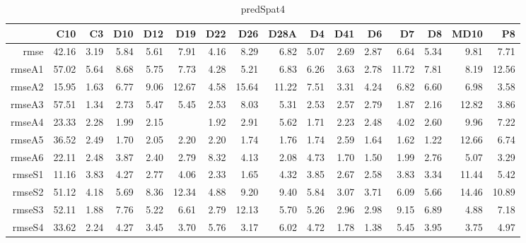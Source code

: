 \begin{table}[H]
\centering
\begin{tabular}{rrrrrrrrrrrrrrrr}
  \hline
 & C10 & C3 & D10 & D12 & D19 & D22 & D26 & D28A & D4 & D41 & D6 & D7 & D8 & MD10 & P8 \\ 
  \hline
rmse & 42.16 & 3.19 & 5.84 & 5.61 & 7.91 & 4.16 & 8.29 & 6.82 & 5.07 & 2.69 & 2.87 & 6.64 & 5.34 & 9.81 & 7.71 \\ 
  rmseA1 & 57.02 & 5.64 & 8.68 & 5.75 & 7.73 & 4.28 & 5.21 & 6.83 & 6.26 & 3.63 & 2.78 & 11.72 & 7.81 & 8.19 & 12.56 \\ 
  rmseA2 & 15.95 & 1.63 & 6.77 & 9.06 & 12.67 & 4.58 & 15.64 & 11.22 & 7.51 & 3.31 & 4.24 & 6.82 & 6.60 & 6.98 & 3.58 \\ 
  rmseA3 & 57.51 & 1.34 & 2.73 & 5.47 & 5.45 & 2.53 & 8.03 & 5.31 & 2.53 & 2.57 & 2.79 & 1.87 & 2.16 & 12.82 & 3.86 \\ 
  rmseA4 & 23.33 & 2.28 & 1.99 & 2.15 &  & 1.92 & 2.91 & 5.62 & 1.71 & 2.23 & 2.48 & 4.02 & 2.60 & 9.96 & 7.22 \\ 
  rmseA5 & 36.52 & 2.49 & 1.70 & 2.05 & 2.20 & 2.20 & 1.74 & 1.76 & 1.74 & 2.59 & 1.64 & 1.62 & 1.22 & 12.66 & 6.74 \\ 
  rmseA6 & 22.11 & 2.48 & 3.87 & 2.40 & 2.79 & 8.32 & 4.13 & 2.08 & 4.73 & 1.70 & 1.50 & 1.99 & 2.76 & 5.07 & 3.29 \\ 
  rmseS1 & 11.16 & 3.83 & 4.27 & 2.77 & 4.06 & 2.33 & 1.65 & 4.32 & 3.85 & 2.67 & 2.58 & 3.83 & 3.34 & 11.44 & 5.42 \\ 
  rmseS2 & 51.12 & 4.18 & 5.69 & 8.36 & 12.34 & 4.88 & 9.20 & 9.40 & 5.84 & 3.07 & 3.71 & 6.09 & 5.66 & 14.46 & 10.89 \\ 
  rmseS3 & 52.11 & 1.88 & 7.76 & 5.22 & 6.61 & 2.79 & 12.13 & 5.70 & 5.26 & 2.96 & 2.98 & 9.15 & 6.89 & 4.88 & 7.18 \\ 
  rmseS4 & 33.62 & 2.24 & 4.27 & 3.45 & 3.70 & 5.76 & 3.17 & 6.02 & 4.72 & 1.78 & 1.38 & 5.45 & 3.95 & 3.75 & 4.97 \\ 
   \hline
\end{tabular}
\caption{predSpat4} 
\end{table}
